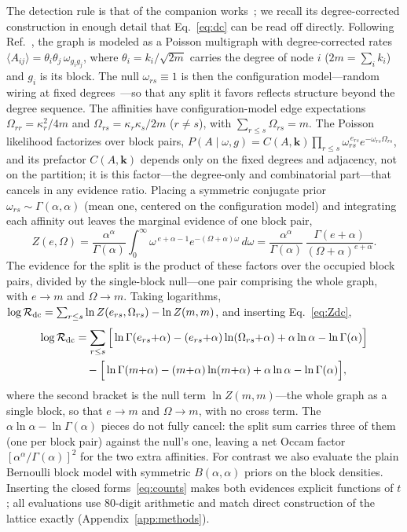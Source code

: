 \documentclass[preprint,12pt]{elsarticle}
\newcommand{\Rev}{\mathcal{R}}
\newcommand{\logR}{\log \Rev}
\newcommand{\Om}{\Omega}
\begin{document}
The detection rule is that of the companion
works~\cite{vazquez2026ringwantsbroken,
vazquez2026communitystructurepseudofractalweb}; we recall its degree-corrected
construction in enough detail that Eq.~\eqref{eq:dc} can be read off directly.
Following Ref.~\cite{vazquez2026communitystructurepseudofractalweb}, the graph
is modeled as a Poisson multigraph with degree-corrected rates
$\langle A_{ij}\rangle=\theta_i\theta_j\,\omega_{g_ig_j}$, where
$\theta_i=k_i/\sqrt{2m}$ carries the degree of node $i$ ($2m=\sum_i k_i$) and
$g_i$ is its block. The null $\omega_{rs}\equiv1$ is then the configuration
model---random wiring at fixed degrees~\cite{karrer2011}---so that any split it
favors reflects structure beyond the degree sequence. The affinities have
configuration-model edge expectations $\Om_{rr}=\kappa_r^2/4m$ and
$\Om_{rs}=\kappa_r\kappa_s/2m$ ($r\neq s$), with $\sum_{r\le s}\Om_{rs}=m$. The
Poisson likelihood factorizes over block pairs,
$P(A\mid\omega,g)=C(A,\bm k)\prod_{r\le s}
\omega_{rs}^{\,e_{rs}}e^{-\omega_{rs}\Om_{rs}}$, and its prefactor $C(A,\bm k)$
depends only on the fixed degrees and adjacency, not on the partition; it is
this factor---the degree-only and combinatorial part---that cancels in any
evidence ratio. Placing a symmetric conjugate prior
$\omega_{rs}\sim\Gamma(\alpha,\alpha)$ (mean one, centered on the configuration
model) and integrating each affinity out leaves the marginal evidence of one
block pair,
\begin{equation}
  Z(e,\Om)=\frac{\alpha^\alpha}{\Gamma(\alpha)}\int_0^\infty\!
    \omega^{\,e+\alpha-1}e^{-(\Om+\alpha)\omega}\,d\omega
    =\frac{\alpha^\alpha}{\Gamma(\alpha)}\,
     \frac{\Gamma(e{+}\alpha)}{(\Om{+}\alpha)^{e+\alpha}} .
  \label{eq:Zdc}
\end{equation}
The evidence for the split is the product of these factors over the occupied
block pairs, divided by the single-block null---one pair comprising the whole
graph, with $e\!\to\!m$ and $\Om\!\to\!m$. Taking logarithms,
$\logR_{\rm dc}=\sum_{r\le s}\ln Z(e_{rs},\Om_{rs})-\ln Z(m,m)$, and inserting
Eq.~\eqref{eq:Zdc},
\begin{align}
  \logR_{\rm dc}
  &= \sum_{r\le s}\Big[\ln\Gamma(e_{rs}{+}\alpha)
      -(e_{rs}{+}\alpha)\ln(\Om_{rs}{+}\alpha)
      +\alpha\ln\alpha-\ln\Gamma(\alpha)\Big] \notag\\
  &\quad -\Big[\ln\Gamma(m{+}\alpha)-(m{+}\alpha)\ln(m{+}\alpha)
      +\alpha\ln\alpha-\ln\Gamma(\alpha)\Big],
  \label{eq:dc}
\end{align}
where the second bracket is the null term $\ln Z(m,m)$---the whole graph as a
single block, so that $e\!\to\!m$ and $\Om\!\to\!m$, with no cross term. The
$\alpha\ln\alpha-\ln\Gamma(\alpha)$ pieces do not fully cancel: the split sum
carries three of them (one per block pair) against the null's one, leaving a net
Occam factor $[\alpha^\alpha/\Gamma(\alpha)]^{2}$ for the two extra affinities.
For contrast we also evaluate the plain Bernoulli block model with symmetric
$B(\alpha,\alpha)$ priors on the block densities. Inserting the closed
forms~\eqref{eq:counts} makes both evidences explicit functions of $t$; all
evaluations use 80-digit arithmetic and match direct construction of the
lattice exactly (Appendix~\ref{app:methods}).
\end{document}
